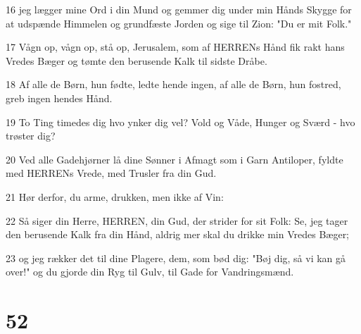 \par 16 jeg lægger mine Ord i din Mund og gemmer dig under min Hånds Skygge for at udspænde Himmelen og grundfæste Jorden og sige til Zion: "Du er mit Folk."
\par 17 Vågn op, vågn op, stå op, Jerusalem, som af HERRENs Hånd fik rakt hans Vredes Bæger og tømte den berusende Kalk til sidste Dråbe.
\par 18 Af alle de Børn, hun fødte, ledte hende ingen, af alle de Børn, hun fostred, greb ingen hendes Hånd.
\par 19 To Ting timedes dig hvo ynker dig vel? Vold og Våde, Hunger og Sværd - hvo trøster dig?
\par 20 Ved alle Gadehjørner lå dine Sønner i Afmagt som i Garn Antiloper, fyldte med HERRENs Vrede, med Trusler fra din Gud.
\par 21 Hør derfor, du arme, drukken, men ikke af Vin:
\par 22 Så siger din Herre, HERREN, din Gud, der strider for sit Folk: Se, jeg tager den berusende Kalk fra din Hånd, aldrig mer skal du drikke min Vredes Bæger;
\par 23 og jeg rækker det til dine Plagere, dem, som bød dig: "Bøj dig, så vi kan gå over!" og du gjorde din Ryg til Gulv, til Gade for Vandringsmænd.

\chapter{52}

